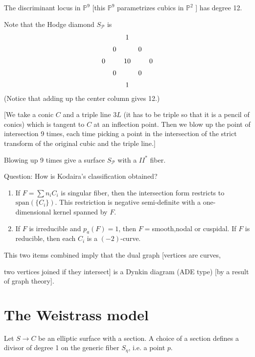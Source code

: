 \begin{lemma}
\label{lemma-discriminant-locus}
The discriminant locus in $\mathbb{P}^9$
[this $\mathbb{P}^9$ parametrizes cubics in
$\mathbb{P}^2$ ]
has degree 12.
\end{lemma}

\noindent
Note that the Hodge diamond $S_{\mathcal{P}}$
is
$$
\xymatrix@C=.5em@R=.5em{
& & 1\\
& 0 && 0\\
0 && 10 && 0\\
& 0 &&0\\
& & 1
}
$$
(Notice that adding up the center column
gives 12.)

\begin{example}
\label{example-pencil-of-conics}
[We take a conic $C$
and a triple line $3L$
(it has to be triple so that it is a pencil
of conics)
which is tangent to $C$ at an inflection
point.
Then we blow up the point of intersection 9
times,
each time picking a point in the intersection
of the strict transform of the original cubic
and the triple line.]

Blowing up 9 times give
a surface $S_{\mathcal{P}}$ with
a $II^*$ fiber.
\end{example}

\medskip\noindent
Question: How is Kodaira's classification
obtained?

\begin{enumerate}
\item If $F=\sum n_iC_i$ is singular fiber,
then the intersection form restricts
to
$\text{span}(\{C_i\})$.
This restriction is negative semi-definite
with a one-dimensional kernel spanned by $F$.

\item If $F$ is irreducible and $p_a(F)=1$,
then $F=$smooth,nodal or cuspidal.
 If $F$ is reducible, then each $C_i$ is
a $(-2)$-curve.
\end{enumerate}

\noindent
This two items combined imply that the
dual graph [vertices are curves,

two vertices joined if they intersect]
is a Dynkin diagram (ADE type)
[by a result of graph theory].




\section{The Weistrass model}
\label{section-weierstrass-model}

\noindent
Let $S \to C$ be an elliptic surface
with a section.
A choice of a section defines
a divisor of degree 1 on the generic fiber
$S_\eta$,
i.e. a point $p$.


